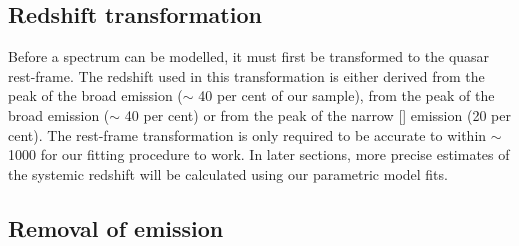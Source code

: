\subsection{Redshift transformation}

Before a spectrum can be modelled, it must first be transformed to the quasar rest-frame.  
The redshift used in this transformation is either derived from the peak of the broad \ha emission ($\sim$ 40 per cent of our sample), from the peak of the broad \hb emission ($\sim$ 40 per cent) or from the peak of the narrow [] emission (20 per cent).
The rest-frame transformation is only required to be accurate to within $\sim$1000 \kms for our fitting procedure to work. 
In later sections, more precise estimates of the systemic redshift will be calculated using our parametric model fits. 

\subsection{Removal of  emission}

